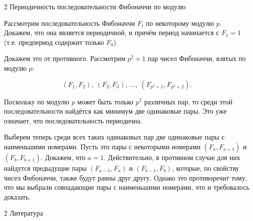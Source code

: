\h2{ Периодичность последовательности Фибоначчи по модулю }

Рассмотрим последовательность Фибоначчи $F_i$ по некоторому модулю $p$. Докажем, что она является периодичной, и причём период начинается с $F_1=1$ (т.е. предпериод содержит только $F_0$).

Докажем это от противного. Рассмотрим $p^2+1$ пар чисел Фибоначчи, взятых по модулю $p$:

$$(F_1,F_2),\ (F_2,F_3),\ \ldots,\ (F_{p^2+1},F_{p^2+2}).$$

Поскольку по модулю $p$ может быть только $p^2$ различных пар, то среди этой последовательности найдётся как минимум две одинаковые пары. Это уже означает, что последовательность периодична.

Выберем теперь среди всех таких одинаковых пар две одинаковые пары с наименьшими номерами. Пусть это пары с некоторыми номерами $(F_a,F_{a+1})$ и $(F_b,F_{b+1})$. Докажем, что $a=1$. Действительно, в противном случае для них найдутся предыдущие пары $(F_{a-1},F_a)$ и $(F_{b-1},F_b)$, которые, по свойству чисел Фибоначчи, также будут равны друг другу. Однако это противоречит тому, что мы выбрали совпадающие пары с наименьшими номерами, что и требовалось доказать.


\h2{ Литература }

\ul{
\li {}
}
